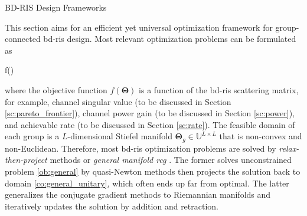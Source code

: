	\begin{section}{BD-RIS Design Frameworks}

	This section aims for an efficient yet universal optimization framework for group-connected \gls{bd}-\gls{ris} design.
	Most relevant optimization problems can be formulated as
	\begin{maxi!}
	{\scriptstyle{\mathbf{\Theta}}}{f(\mathbf{\Theta})}{\label{op:general}}{\label{ob:general}}
	\end{maxi!}
	where the objective function $f(\mathbf{\Theta})$ is a function of the \gls{bd}-\gls{ris} scattering matrix, for example, channel singular value (to be discussed in Section \ref{sc:pareto_frontier}), channel power gain (to be discussed in Section \ref{sc:power}), and achievable rate (to be discussed in Section \ref{sc:rate}).
	The feasible domain of each group is a $L$-dimensional Stiefel manifold $\mathbf{\Theta}_g \in \mathbb{U}^{L \times L}$ that is non-convex and non-Euclidean.
	Therefore, most \gls{bd}-\gls{ris} optimization problems are solved by \emph{relax-then-project} methods \cite{Fang2023} or \emph{general manifold \gls{rcg}} \cite{Li2023b,Li2023c,Zhou2023}.
	The former solves unconstrained problem \eqref{ob:general} by quasi-Newton methods then projects the solution back to domain \ref{co:general_unitary}, which often ends up far from optimal.
	The latter generalizes the conjugate gradient methods to Riemannian manifolds and iteratively updates the solution by addition and retraction.

\end{section}
